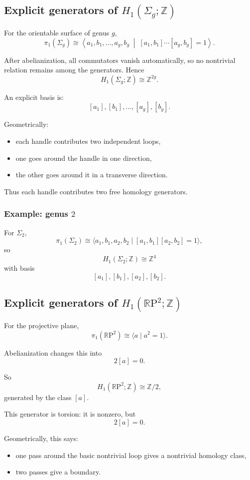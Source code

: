 \documentclass[12pt,a4paper]{article}
\newcommand{\RP}{\mathbb{R}\mathrm{P}}
\newcommand{\Z}{\mathbb{Z}}
\theoremstyle{notespace}
\begin{document}
\subsection{Explicit generators of \(H_1(\Sigma_g;\Z)\)}

For the orientable surface of genus \(g\),
\[
\pi_1(\Sigma_g)\cong
\left\langle
a_1,b_1,\dots,a_g,b_g
\;\middle|\;
[a_1,b_1]\cdots[a_g,b_g]=1
\right\rangle.
\]

After abelianization, all commutators vanish automatically, so no nontrivial relation remains among the generators. Hence
\[
H_1(\Sigma_g;\Z)\cong \Z^{2g}.
\]

An explicit basis is:
\[
[a_1],[b_1],\dots,[a_g],[b_g].
\]

Geometrically:
\begin{itemize}
	\item each handle contributes two independent loops,
	\item one goes around the handle in one direction,
	\item the other goes around it in a transverse direction.
\end{itemize}

Thus each handle contributes two free homology generators.

\subsubsection*{Example: genus \(2\)}

For \(\Sigma_2\),
\[
\pi_1(\Sigma_2)\cong \langle a_1,b_1,a_2,b_2\mid [a_1,b_1][a_2,b_2]=1\rangle,
\]
so
\[
H_1(\Sigma_2;\Z)\cong \Z^4
\]
with basis
\[
[a_1],[b_1],[a_2],[b_2].
\]

\subsection{Explicit generators of \(H_1(\RP^2;\Z)\)}

For the projective plane,
\[
\pi_1(\RP^2)\cong \langle a\mid a^2=1\rangle.
\]

Abelianization changes this into
\[
2[a]=0.
\]

So
\[
H_1(\RP^2;\Z)\cong \Z/2,
\]
generated by the class \([a]\).

This generator is torsion: it is nonzero, but
\[
2[a]=0.
\]

Geometrically, this says:
\begin{itemize}
	\item one pass around the basic nontrivial loop gives a nontrivial homology class,
	\item two passes give a boundary.
\end{itemize}
\end{document}

